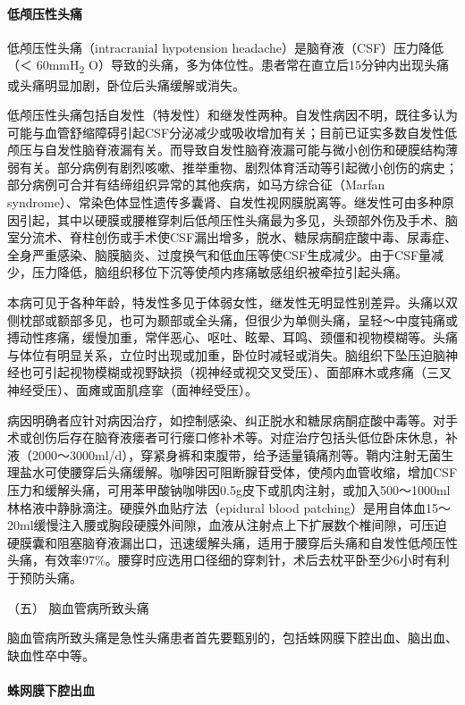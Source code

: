 \paragraph{低颅压性头痛}

低颅压性头痛（intracranial hypotension
headache）是脑脊液（CSF）压力降低（＜ 60mmH\textsubscript{2}
O）导致的头痛，多为体位性。患者常在直立后15分钟内出现头痛或头痛明显加剧，卧位后头痛缓解或消失。

低颅压性头痛包括自发性（特发性）和继发性两种。自发性病因不明，既往多认为可能与血管舒缩障碍引起CSF分泌减少或吸收增加有关；目前已证实多数自发性低颅压与自发性脑脊液漏有关。而导致自发性脑脊液漏可能与微小创伤和硬膜结构薄弱有关。部分病例有剧烈咳嗽、推举重物、剧烈体育活动等引起微小创伤的病史；部分病例可合并有结缔组织异常的其他疾病，如马方综合征（Marfan
syndrome）、常染色体显性遗传多囊肾、自发性视网膜脱离等。继发性可由多种原因引起，其中以硬膜或腰椎穿刺后低颅压性头痛最为多见，头颈部外伤及手术、脑室分流术、脊柱创伤或手术使CSF漏出增多，脱水、糖尿病酮症酸中毒、尿毒症、全身严重感染、脑膜脑炎、过度换气和低血压等使CSF生成减少。由于CSF量减少，压力降低，脑组织移位下沉等使颅内疼痛敏感组织被牵拉引起头痛。

本病可见于各种年龄，特发性多见于体弱女性，继发性无明显性别差异。头痛以双侧枕部或额部多见，也可为颞部或全头痛，但很少为单侧头痛，呈轻～中度钝痛或搏动性疼痛，缓慢加重，常伴恶心、呕吐、眩晕、耳鸣、颈僵和视物模糊等。头痛与体位有明显关系，立位时出现或加重，卧位时减轻或消失。脑组织下坠压迫脑神经也可引起视物模糊或视野缺损（视神经或视交叉受压）、面部麻木或疼痛（三叉神经受压）、面瘫或面肌痉挛（面神经受压）。

病因明确者应针对病因治疗，如控制感染、纠正脱水和糖尿病酮症酸中毒等。对手术或创伤后存在脑脊液瘘者可行瘘口修补术等。对症治疗包括头低位卧床休息，补液（2000～3000ml/d），穿紧身裤和束腹带，给予适量镇痛剂等。鞘内注射无菌生理盐水可使腰穿后头痛缓解。咖啡因可阻断腺苷受体，使颅内血管收缩，增加CSF压力和缓解头痛，可用苯甲酸钠咖啡因0.5g皮下或肌肉注射，或加入500～1000ml林格液中静脉滴注。硬膜外血贴疗法（epidural
blood
patching）是用自体血15～20ml缓慢注入腰或胸段硬膜外间隙，血液从注射点上下扩展数个椎间隙，可压迫硬膜囊和阻塞脑脊液漏出口，迅速缓解头痛，适用于腰穿后头痛和自发性低颅压性头痛，有效率97\%。腰穿时应选用口径细的穿刺针，术后去枕平卧至少6小时有利于预防头痛。

\hypertarget{text00020.htmlux5cux23CHP1-7-4-5}{}
（五） 脑血管病所致头痛

脑血管病所致头痛是急性头痛患者首先要甄别的，包括蛛网膜下腔出血、脑出血、缺血性卒中等。

\paragraph{蛛网膜下腔出血}

